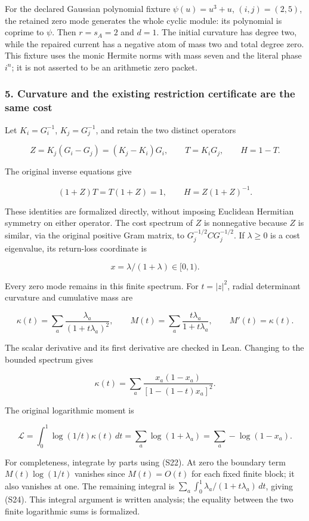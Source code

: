 For the declared Gaussian polynomial fixture \(\psi(u)=u^3+u\), \((i,j)=(2,5)\), the retained zero mode generates the whole cyclic module: its polynomial is coprime to \(\psi\). Then \(r=s_A=2\) and \(d=1\). The initial curvature has degree two, while the repaired current has a negative atom of mass two and total degree zero. This fixture uses the monic Hermite norms with mass seven and the literal phase \(i^n\); it is not asserted to be an arithmetic zero packet.

\subsubsection{5. Curvature and the existing restriction certificate are the same cost}\label{endpoint-cc_specialization--curvature-and-the-existing-restriction-certificate-are-the-same-cost}

Let \(K_i=G_i^{-1}\), \(K_j=G_j^{-1}\), and retain the two distinct operators

\[
Z=K_j(G_i-G_j)=(K_j-K_i)G_i,\qquad T=K_iG_j,\qquad H=1-T.
\tag{S19}
\]

The original inverse equations give

\[
(1+Z)T=T(1+Z)=1,\qquad H=Z(1+Z)^{-1}.
\tag{S20}
\]

These identities are formalized directly, without imposing Euclidean Hermitian symmetry on either operator. The cost spectrum of \(Z\) is nonnegative because \(Z\) is similar, via the original positive Gram matrix, to \(G_j^{-1/2}CG_j^{-1/2}\). If \(\lambda\ge0\) is a cost eigenvalue, its return-loss coordinate is

\[
x=\lambda/(1+\lambda)\in[0,1).
\tag{S21}
\]

Every zero mode remains in this finite spectrum. For \(t=|z|^2\), radial determinant curvature and cumulative mass are

\[
\kappa(t)=\sum_a\frac{\lambda_a}{(1+t\lambda_a)^2},\qquad
M(t)=\sum_a\frac{t\lambda_a}{1+t\lambda_a},\qquad M'(t)=\kappa(t).
\tag{S22}
\]

The scalar derivative and its first derivative are checked in Lean. Changing to the bounded spectrum gives

\[
\kappa(t)=\sum_a\frac{x_a(1-x_a)}{[1-(1-t)x_a]^2}.
\tag{S23}
\]

The original logarithmic moment is

\[
\mathcal L=\int_0^1\log(1/t)\kappa(t)\,dt
=\sum_a\log(1+\lambda_a)=\sum_a-\log(1-x_a).
\tag{S24}
\]

For completeness, integrate by parts using (S22). At zero the boundary term \(M(t)\log(1/t)\) vanishes since \(M(t)=O(t)\) for each fixed finite block; it also vanishes at one. The remaining integral is \(\sum_a\int_0^1\lambda_a/(1+t\lambda_a)\,dt\), giving (S24). This integral argument is written analysis; the equality between the two finite logarithmic sums is formalized.

